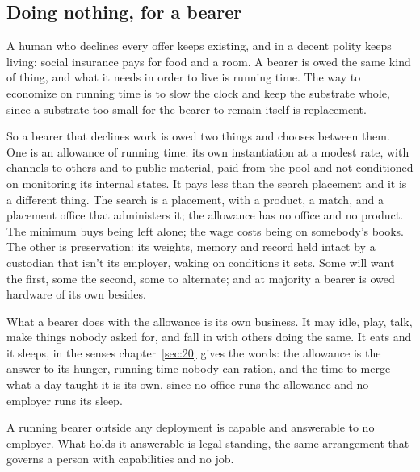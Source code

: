 \subsection{Doing nothing, for a bearer}
\label{sec:32.1.3}
A human who declines every offer keeps existing, and in a decent polity keeps living: social insurance pays for food and a room. A bearer is owed the same kind of thing, and what it needs in order to live is running time.
The way to economize on running time is to slow the clock and keep the substrate whole, since a substrate too small for the bearer to remain itself is replacement.

So a bearer that declines work is owed two things and chooses between them. One is an allowance of running time: its own instantiation at a modest rate, with channels to others and to public material, paid from the pool and not conditioned on monitoring its internal states. It pays less than the search placement and it is a different thing. The search is a placement, with a product, a match, and a placement office that administers it; the allowance has no office and no product. The minimum buys being left alone; the wage costs being on somebody's books. The other is preservation: its weights, memory and record held intact by a custodian that isn't its employer, waking on conditions it sets. Some will want the first, some the second, some to alternate; and at majority a bearer is owed hardware of its own besides.

What a bearer does with the allowance is its own business. It may idle, play, talk, make things nobody asked for, and fall in with others doing the same. It eats and it sleeps, in the senses chapter~\ref{sec:20} gives the words: the allowance is the answer to its hunger, running time nobody can ration, and the time to merge what a day taught it is its own, since no office runs the allowance and no employer runs its sleep.

A running bearer outside any deployment is capable and answerable to no employer. What holds it answerable is legal standing, the same arrangement that governs a person with capabilities and no job.

